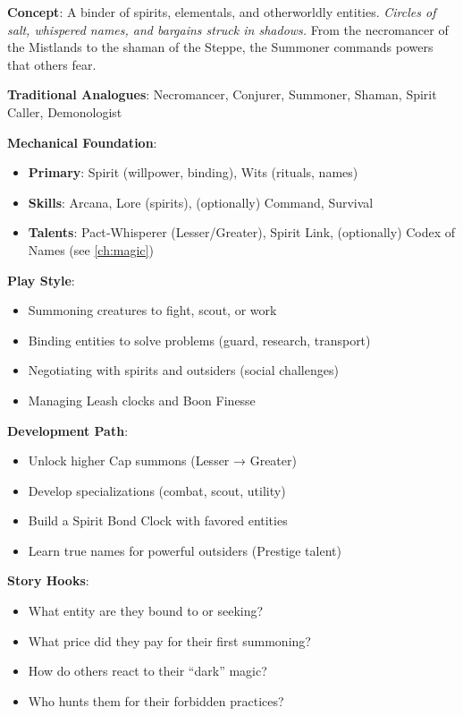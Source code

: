 \textbf{Concept}: A binder of spirits, elementals, and otherworldly entities. \emph{Circles of salt, whispered names, and bargains struck in shadows.} From the necromancer of the Mistlands to the shaman of the Steppe, the Summoner commands powers that others fear.

\textbf{Traditional Analogues}: Necromancer, Conjurer, Summoner, Shaman, Spirit Caller, Demonologist

\textbf{Mechanical Foundation}:
\begin{itemize}
\item \textbf{Primary}: Spirit (willpower, binding), Wits (rituals, names)
\item \textbf{Skills}: Arcana, Lore (spirits), (optionally) Command, Survival
\item \textbf{Talents}: Pact‑Whisperer (Lesser/Greater), Spirit Link, (optionally) Codex of Names (see \ref{ch:magic})
\end{itemize}

\textbf{Play Style}:
\begin{itemize}
\item Summoning creatures to fight, scout, or work
\item Binding entities to solve problems (guard, research, transport)
\item Negotiating with spirits and outsiders (social challenges)
\item Managing Leash clocks and Boon Finesse
\end{itemize}

\textbf{Development Path}:
\begin{itemize}
\item Unlock higher Cap summons (Lesser → Greater)
\item Develop specializations (combat, scout, utility)
\item Build a Spirit Bond Clock with favored entities
\item Learn true names for powerful outsiders (Prestige talent)
\end{itemize}

\textbf{Story Hooks}:
\begin{itemize}
\item What entity are they bound to or seeking?
\item What price did they pay for their first summoning?
\item How do others react to their “dark” magic?
\item Who hunts them for their forbidden practices?
\end{itemize}

